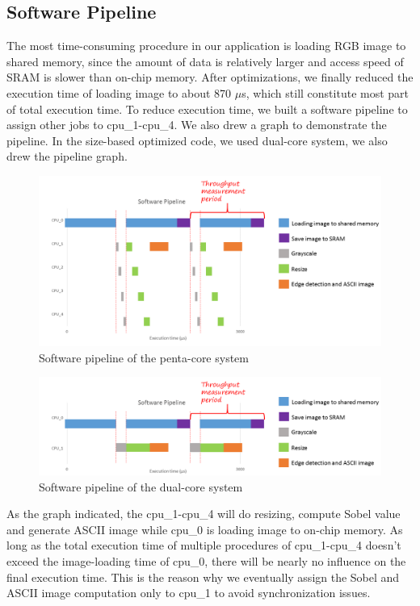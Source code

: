 \documentclass[conference]{IEEEtran}
\begin{document}
\subsection{Software Pipeline}
The most time-consuming procedure in our application is loading RGB image to shared memory, since the amount of data is relatively larger and access speed of SRAM is slower than on-chip memory. After optimizations, we finally reduced the execution time of loading image to about 870 $\mu$s, which still constitute most part of total execution time. To reduce execution time, we built a software pipeline to assign other jobs to cpu\_1-cpu\_4. We also drew a graph to demonstrate the pipeline. In the size-based optimized code, we used dual-core system, we also drew the pipeline graph.\\
\begin{figure}
	\centering
	\includegraphics[scale=0.55]{pipeline.png}
	\caption{Software pipeline of the penta-core system}
	\label{fg:pipeline}
\end{figure}
\begin{figure}
	\centering
	\label{fig:Dualcore}
	\includegraphics[scale=0.55]{dualcore.png}
	\caption{Software pipeline of the dual-core system}
\end{figure}
\indent
As the graph indicated, the cpu\_1-cpu\_4 will do resizing, compute Sobel value and generate ASCII image while cpu\_0 is loading image to on-chip memory. As long as the total execution time of multiple procedures of cpu\_1-cpu\_4 doesn't exceed the image-loading time of cpu\_0, there will be nearly no influence on the final execution time. This is the reason why we eventually assign the Sobel and ASCII image computation only to cpu\_1 to avoid synchronization issues.
\end{document}
